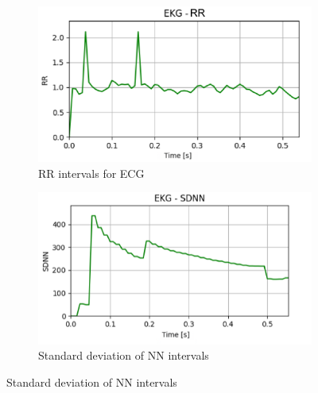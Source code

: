 \documentclass{citask}
\begin{document}
\begin{figure}[h]
    \centering
    \begin{subfigure}{0.47\textwidth}
        \centering
        \includegraphics[width=\linewidth]{images/MEAN_EKG.png}
        \caption{RR intervals for ECG}
    \end{subfigure}
    
   \vspace{0.2cm} 
    \begin{subfigure}{0.49\textwidth}
        \centering
        \includegraphics[width=\linewidth]{images/SDNN_EKG.png}
        \caption{Standard deviation of NN intervals}
    \end{subfigure}
    

\end{figure}
\end{document}
